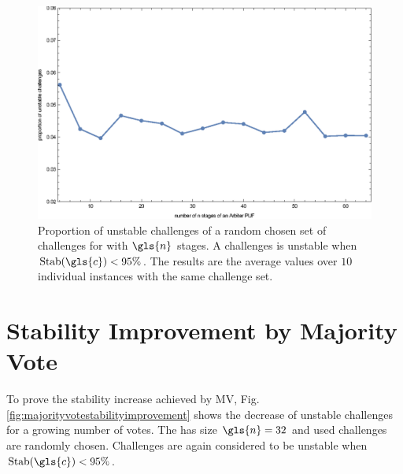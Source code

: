 \begin{figure}[ht]
\includegraphics[width=1.00\textwidth]{images/stages-stab-simulation.eps}
\caption[Proportion of unstable challenges of an \apuf]{Proportion of unstable challenges of a random chosen set of challenges for \apufs with $\gls{n}$ stages. 
A challenges is unstable when $\Stab(\gls{c}) < 95 \%$. 
The results are the average values over $10$ individual \puf instances with the same challenge set.} 
\label{fig:arbiterstabilities}
\end{figure}


\section{Stability Improvement by Majority Vote}
\label{sec:stabilityimprovementbymajorityvote}

To prove the stability increase achieved by \ac{MV}, Fig. \ref{fig:majorityvotestabilityimprovement} shows the decrease of unstable challenges for a growing number of votes.
The \mpuf has size $\gls{n} = 32$ and used challenges are randomly chosen.
Challenges are again considered to be unstable when $\Stab(\gls{c}) < 95 \%$.


